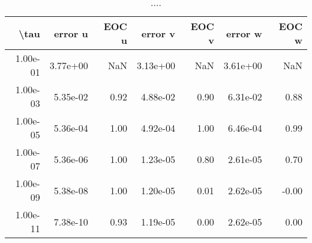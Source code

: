 \begin{table}[ht]
\centering
\begin{tabular}{rrrrrrr}
  \hline
  \textbf{\textbackslash{}tau} & \textbf{error u} & \textbf{EOC u} & \textbf{error v} & \textbf{EOC v} & \textbf{error w} & \textbf{EOC w} \\\hline
  1.00e-01 & 3.77e+00 & NaN & 3.13e+00 & NaN & 3.61e+00 & NaN \\
  1.00e-03 & 5.35e-02 & 0.92 & 4.88e-02 & 0.90 & 6.31e-02 & 0.88 \\
  1.00e-05 & 5.36e-04 & 1.00 & 4.92e-04 & 1.00 & 6.46e-04 & 0.99 \\
  1.00e-07 & 5.36e-06 & 1.00 & 1.23e-05 & 0.80 & 2.61e-05 & 0.70 \\
  1.00e-09 & 5.38e-08 & 1.00 & 1.20e-05 & 0.01 & 2.62e-05 & -0.00 \\
  1.00e-11 & 7.38e-10 & 0.93 & 1.19e-05 & 0.00 & 2.62e-05 & 0.00 \\\hline
\end{tabular}
\caption{....}
\end{table}
